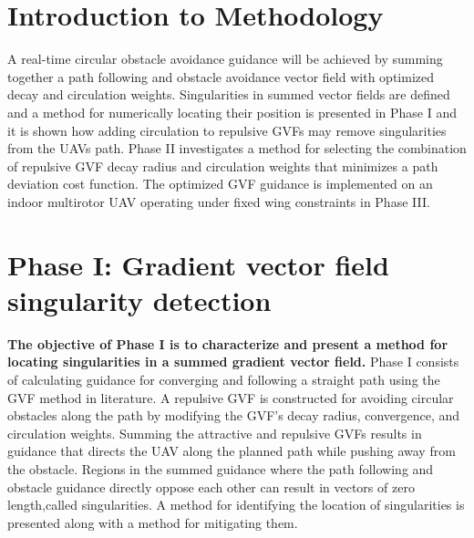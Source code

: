 \documentclass[numbered,pdftex]{ohio-etd}
\begin{document}
%



\section{Introduction to Methodology}
A real-time circular obstacle avoidance guidance will be achieved by summing together a path following and obstacle avoidance vector field with optimized decay and circulation weights. Singularities in summed vector fields are defined and a method for numerically locating their position is presented in Phase I and it is shown how adding circulation to repulsive GVFs may remove singularities from the UAVs path. Phase II investigates a method for selecting the combination of repulsive GVF decay radius and circulation weights that minimizes a path deviation cost function. The optimized GVF guidance is implemented on an indoor multirotor UAV operating under fixed wing constraints in Phase III.


\section{Phase I: Gradient vector field singularity detection}
 \textbf{The objective of Phase I is to characterize and present a method for locating singularities in a summed gradient vector field.} Phase I consists of calculating guidance for converging and following a straight path using the GVF method in literature. A repulsive GVF is constructed for avoiding circular obstacles along the path by modifying the GVF's decay radius, convergence, and circulation weights. Summing the attractive and repulsive GVFs results in guidance that directs the UAV along the planned path while pushing away from the obstacle. Regions in the summed guidance where the path following and obstacle guidance directly oppose each other can result in vectors of zero length,called singularities. A method for identifying the location of singularities is presented along with a method for mitigating them. 
 
\end{document}
